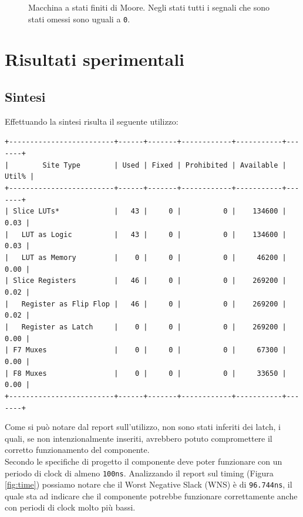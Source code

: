 \documentclass[fleqn,11pt]{article}
\begin{document}
\begin{figure}[h]
\begin{tikzpicture}
    \end{tikzpicture}
    \caption{Macchina a stati finiti di Moore. Negli stati tutti i segnali che sono stati omessi sono uguali a \texttt{0}.}
    \label{fig:fsm}
\end{figure}
\vfill
\pagebreak

\section{Risultati sperimentali}
\subsection{Sintesi}
Effettuando la sintesi risulta il seguente utilizzo:
\begin{center}
\verb|+-------------------------+------+-------+------------+-----------+-------+|\nopagebreak\\
\verb=|        Site Type        | Used | Fixed | Prohibited | Available | Util% |=\nopagebreak\\
\verb=+-------------------------+------+-------+------------+-----------+-------+=\nopagebreak\\
\verb=| Slice LUTs*             |   43 |     0 |          0 |    134600 |  0.03 |=\nopagebreak\\
\verb=|   LUT as Logic          |   43 |     0 |          0 |    134600 |  0.03 |=\nopagebreak\\
\verb=|   LUT as Memory         |    0 |     0 |          0 |     46200 |  0.00 |=\nopagebreak\\
\verb=| Slice Registers         |   46 |     0 |          0 |    269200 |  0.02 |=\nopagebreak\\
\verb=|   Register as Flip Flop |   46 |     0 |          0 |    269200 |  0.02 |=\nopagebreak\\
\verb=|   Register as Latch     |    0 |     0 |          0 |    269200 |  0.00 |=\nopagebreak\\
\verb=| F7 Muxes                |    0 |     0 |          0 |     67300 |  0.00 |=\nopagebreak\\
\verb=| F8 Muxes                |    0 |     0 |          0 |     33650 |  0.00 |=\nopagebreak\\
\verb|+-------------------------+------+-------+------------+-----------+-------+|\nopagebreak\\
\end{center}

Come si può notare dal report sull'utilizzo, non sono stati inferiti dei latch, i quali, se non intenzionalmente inseriti, avrebbero potuto compromettere il corretto funzionamento del componente.\\
Secondo le specifiche di progetto il componente deve poter funzionare con un periodo di clock di almeno \verb|100ns|. Analizzando il report sul timing (Figura \ref{fig:time}) possiamo notare che il Worst Negative Slack (WNS) è di \verb|96.744ns|, il quale sta ad indicare che il componente potrebbe funzionare correttamente anche con periodi di clock molto più bassi. %
\end{document}
